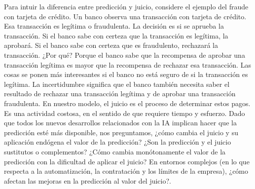 Para intuir la diferencia entre predicción y juicio, considere el ejemplo del fraude con tarjeta de crédito. Un banco observa una transacción con tarjeta de crédito. Esa transacción es legítima o fraudulenta. La decisión es si se aprueba la transacción. Si el banco sabe con certeza que la transacción es legítima, la aprobará. Si el banco sabe con certeza que es fraudulento, rechazará la transacción. ¿Por qué? Porque el banco sabe que la recompensa de aprobar una transacción legítima es mayor que la recompensa de rechazar esa transacción. Las cosas se ponen más interesantes si el banco no está seguro de si la transacción es legítima. La incertidumbre significa que el banco también necesita saber el resultado de rechazar una transacción legítima y de aprobar una transacción fraudulenta. En nuestro modelo, el juicio es el proceso de determinar estos pagos. Es una actividad costosa, en el sentido de que requiere tiempo y esfuerzo. Dado que todos los nuevos desarrollos relacionados con la IA implican hacer que la predicción esté más disponible, nos preguntamos, ¿cómo cambia el juicio y su aplicación endógena el valor de la predicción? ¿Son la predicción y el juicio sustitutos o complementos? ¿Cómo cambia monótonamente el valor de la predicción con la dificultad de aplicar el juicio? En entornos complejos (en lo que respecta a la automatización, la contratación y los límites de la empresa), ¿cómo afectan las mejoras en la predicción al valor del juicio?.
 
